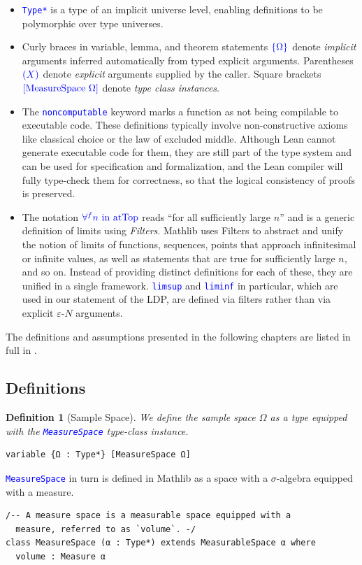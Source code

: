 \documentclass{article}
\newtheorem{definition}[theorem]{Definition}
\newcommand{\leancode}[1]{\textcolor{blue}{\nolinkurl{#1}}}
\begin{document}
\begin{itemize}
  \item \leancode{Type*} is a type of an implicit universe level, enabling definitions to be polymorphic over type universes.
  \item Curly braces in variable, lemma, and theorem statements $\textcolor{blue}{\{\Omega\}}$
    denote \emph{implicit} arguments inferred automatically from typed explicit arguments. Parentheses $\textcolor{blue}{(X)}$ denote \emph{explicit} arguments supplied by the caller.
    Square brackets $\textcolor{blue}{[\text{MeasureSpace}~\Omega]}$ denote
    \emph{type class instances}.
  \item The \leancode{noncomputable} keyword marks a function as not being compilable to executable
    code. These definitions typically involve non-constructive axioms like classical choice or the
    law of excluded middle. Although Lean cannot generate executable code for them, they are still
    part of the type system and can be used for specification and formalization, and the Lean
    compiler will fully type-check them for correctness, so that the logical consistency of proofs
    is preserved.

  \item The notation $\textcolor{blue}{\forall^f n~\text{in}~\text{atTop}}$ reads ``for all
    sufficiently large $n$'' and is a generic definition of limits using \emph{Filters}.
    Mathlib uses Filters to abstract and unify the notion of limits of functions, sequences,
    points that approach infinitesimal or infinite values, as well as statements that are true
    for sufficiently large $n$, and so on.
    Instead of providing distinct definitions for each of these, they are unified in a single
    framework. \leancode{limsup} and \leancode{liminf} in particular, which are used in our
    statement of the LDP, are defined via filters rather than via explicit $\varepsilon$-$N$
    arguments.
\end{itemize}

The definitions and assumptions presented in the following chapters are listed in full in
.

\subsection{Definitions}

\begin{definition}[Sample Space]
  We define the sample space \( \Omega \) as a type equipped with the \leancode{MeasureSpace} type-class instance.
\end{definition}
\begin{lstlisting}
variable {Ω : Type*} [MeasureSpace Ω]
\end{lstlisting}
\leancode{MeasureSpace} in turn is defined in Mathlib as a space with a $\sigma$-algebra equipped with a measure.
\begin{lstlisting}[caption={Mathlib/MeasureTheory/Measure/MeasureSpaceDef.lean}]
/-- A measure space is a measurable space equipped with a
  measure, referred to as `volume`. -/
class MeasureSpace (α : Type*) extends MeasurableSpace α where
  volume : Measure α
\end{lstlisting}
\end{document}
